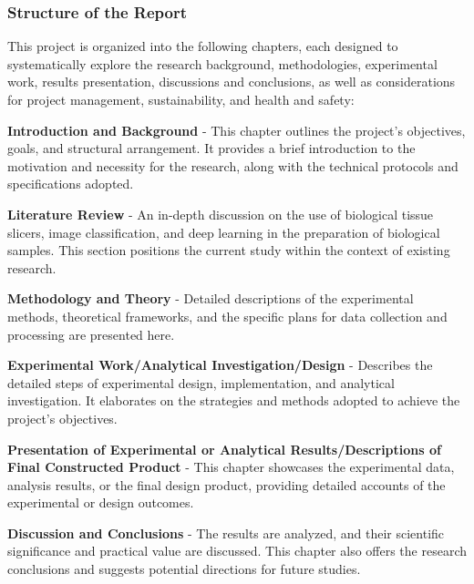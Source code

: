 
\subsubsection{Structure of the Report}

This project is organized into the following chapters, each designed to systematically explore the research background, methodologies, experimental work, results presentation, discussions and conclusions, as well as considerations for project management, sustainability, and health and safety:

\textbf{Introduction and Background} - This chapter outlines the project's objectives, goals, and structural arrangement. It provides a brief introduction to the motivation and necessity for the research, along with the technical protocols and specifications adopted.

\textbf{Literature Review} - An in-depth discussion on the use of biological tissue slicers, image classification, and deep learning in the preparation of biological samples. This section positions the current study within the context of existing research.

\textbf{Methodology and Theory} - Detailed descriptions of the experimental methods, theoretical frameworks, and the specific plans for data collection and processing are presented here.

\textbf{Experimental Work/Analytical Investigation/Design} - Describes the detailed steps of experimental design, implementation, and analytical investigation. It elaborates on the strategies and methods adopted to achieve the project's objectives.

\textbf{Presentation of Experimental or Analytical Results/Descriptions of Final Constructed Product} - This chapter showcases the experimental data, analysis results, or the final design product, providing detailed accounts of the experimental or design outcomes.

\textbf{Discussion and Conclusions} - The results are analyzed, and their scientific significance and practical value are discussed. This chapter also offers the research conclusions and suggests potential directions for future studies.

